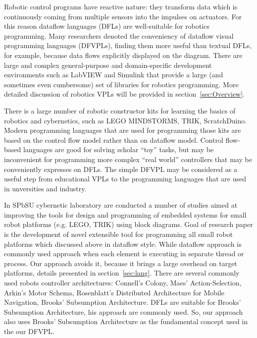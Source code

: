 \documentclass[conference,compsoc]{IEEEtran}
\begin{document}
Robotic control programs have reactive nature: they transform data which is continuously coming from multiple sensors into the impulses on actuators. For this reason dataflow languages (DFLs) are well-suitable for robotics programming. Many researchers denoted the conveniency of dataflow visual programming languages (DFVPLs)\cite{johnston2004advances}, finding them more useful than textual DFLs, for example, because data flows explicitly displayed on the diagram. There are large and complex general-purpose and domain-specific development environments such as LabVIEW\cite{labview} and Simulink\cite{simulink} that provide a large (and sometimes even cumbersome) set of libraries for robotics programming. More detailed discussion of robotics VPLs will be provided in section~\ref{sec:Overview}.

There is a large number of robotic constructor kits for learning the basics of robotics and cybernetics, such as LEGO MINDSTORMS\cite{legokit}, TRIK, ScratchDuino\cite{http://www.scratchduino.com/}. Modern programming languages that are used for programming those kits are based on the control flow model rather than on dataflow model. Control flow-based languages are good for solving scholar ``toy'' tasks, but may be inconvenient for programming more complex ``real world'' controllers that may be conveniently expresses on DFLs. The simple DFVPL may be considered as a useful step from educational VPLs to the programming languages that are used in unversities and industry. 

In SPbSU cybernetic laboratory are conducted a number of studies aimed at improving the tools for design and programming of embedded systems for small robot platforms (e.g. LEGO, TRIK) using block diagrams\cite{}. Goal of research paper is the development of novel extensible tool for programming all small robot platforms which discussed above in dataflow style. While dataflow approach is commonly used approach when each element is executing in separate thread or process. Our approach avoids it, because it brings a large overhead on target platforms, details presented in section~\ref{sec:lang}. There are several commonly used robots controller architectures: Connell's Colony, Maes' Action-Selection, Arkin's Motor Schema, Rosenblatt's Distributed Architecture for Mobile Navigation, Brooks' Subsumption Architecture\cite{simpson2009toward}. DFLs are suitable for Brooks' Subsumption Architecture, his approach are commonly used\cite{banyasad2000visual,simpson2006mobile,posso2011process,proetzsch2007behaviour}. So, our approach also uses Brooks’ Subsumption Architecture as the fundamental concept used in the our DFVPL.
\end{document}
